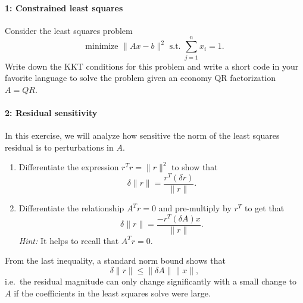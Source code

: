 \documentclass[12pt, leqno]{article} %
\begin{document}

\paragraph*{1: Constrained least squares}
Consider the least squares problem
\[
  \mbox{minimize } \|Ax-b\|^2 \mbox{ s.t. } \sum_{j=1}^n x_i = 1.
\]
Write down the KKT conditions for this problem and write a short code
in your favorite language to solve the problem given an economy QR
factorization $A = QR$.

\paragraph*{2: Residual sensitivity}
In this exercise, we will analyze how sensitive the norm of the least
squares residual is to perturbations in $A$.
\begin{enumerate}
\item
  Differentiate the expression $r^T r = \|r\|^2$ to show that
  \[
    \delta \|r\| = \frac{r^T (\delta r)}{\|r\|}.
  \]
\item
  Differentiate the relationship $A^T r = 0$ and pre-multiply by $r^T$
  to get that
  \[
    \delta \|r\| = \frac{-r^T (\delta A) x}{\|r\|}.
  \]
  {\em Hint:} It helps to recall that $A^T r = 0$.
\end{enumerate}
From the last inequality, a standard norm bound shows that
\[
  \delta \|r\| \leq \|\delta A\| \|x\|,
\]
i.e.~the residual magnitude can only change significantly with a small
change to $A$ if the coefficients in the least squares solve were large.
\end{document}
